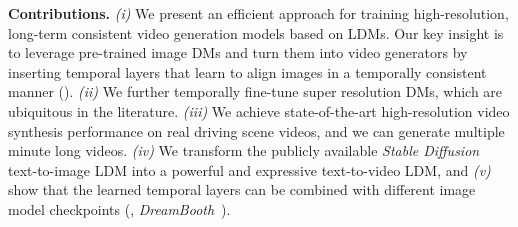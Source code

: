 \textbf{Contributions.} \textit{(i)} We present an efficient approach for training high-resolution, long-term consistent video generation models based on LDMs. Our key insight is to leverage pre-trained image DMs and turn them into video generators by inserting temporal layers that learn to align images in a temporally consistent manner (). \textit{(ii)} We further temporally fine-tune super resolution DMs, which are ubiquitous in the literature. \textit{(iii)} We achieve state-of-the-art high-resolution video synthesis performance on real driving scene videos, and we can generate multiple minute long videos. \textit{(iv)} We transform the publicly available \emph{Stable Diffusion} text-to-image LDM into a powerful and expressive text-to-video LDM, and \textit{(v)} show that the learned temporal layers can be combined with different image model checkpoints (\eg, \emph{DreamBooth}~\cite{ruiz2022dreambooth}).

\vspace{-2mm}

